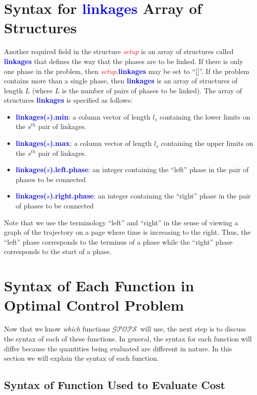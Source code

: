 \documentclass[10pt,final]{report}
\newcommand{\gpops}{$\mathcal{GPOPS}$~}
\newcommand{\bfblue}[1]{\textcolor{blue}{\bf #1}}
\newcommand{\slred}[1]{\textcolor{red}{\sl #1}}
\begin{document}
\section{Syntax for \bfblue{linkages} Array of Structures \label{sect: linkages}}

Another required field in the structure \slred{setup} is an array of
structures called \bfblue{linkages} that defines the way that the
phases are to be linked.  If there is only one phase in the problem, then
\slred{setup}.\bfblue{linkages} may be set to ``[]''.  If the problem
contains more than a single phase, then \bfblue{linkages} is an array
of structures of length $L$ (where $L$ is the number of pairs of phases
to be linked).  The array of structures \bfblue{linkages} is specified
as follows:
\begin{itemize}
\item \bfblue{linkages($s$).min}: a column vector of length $l_s$
  containing the lower limits on the $s^{th}$ pair of linkages.
\item \bfblue{linkages($s$).max}: a column vector of length $l_s$
  containing the upper limits on the $s^{th}$ pair of linkages.
\item \bfblue{linkages($s$).left.phase}: an integer containing the
  ``left'' phase in the pair of phases to be connected
\item \bfblue{linkages($s$).right.phase}: an integer containing the
  ``right'' phase in the pair of phases to be connected
\end{itemize}
Note that we use the terminology ``left'' and ``right'' in the sense
of viewing a graph of the trajectory on a page where time is
increasing to the right.  Thus, the ``left'' phase corresponds to the
terminus of a phase while the ``right'' phase corresponds to the
start of a phase.

\section{Syntax of Each Function in Optimal Control Problem}

Now that we know {\em which} functions \gpops will use, the next step is to
discuss the syntax of each of these functions.  In general, the syntax for
each function will differ because the quantities being evaluated are different
in nature.  In this section we will explain the syntax of each function.

\subsection{Syntax of Function Used to Evaluate Cost}\label{sect:_Cost_syntax}
\end{document}
